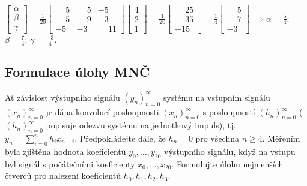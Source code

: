 $\begin{bmatrix}
    \alpha \\
    \beta \\
    \gamma
\end{bmatrix} = \frac{1}{20}
\begin{bmatrix}
    \phantom{-}5 &  \phantom{-}5 & -5\\
    \phantom{-}5 &  \phantom{-}9 & -3\\
    -5           & -3            &  \phantom{-}11
\end{bmatrix}
\begin{bmatrix}
    4 \\
    2 \\
    1
\end{bmatrix} = \frac{1}{20} 
\begin{bmatrix}
    \phantom{-}25\\
    \phantom{-}35\\
    -15
\end{bmatrix} = \frac{1}{4}
\begin{bmatrix}
    \phantom{-}5\\
    \phantom{-}7\\
    -3
\end{bmatrix}$ $\Rightarrow \alpha = \frac{5}{4}$; $\beta = \frac{7}{4}$; $\gamma = \frac{-3}{4}$.

\newpage
\subsection{Formulace úlohy MNČ}
Ať závislost výstupního signálu $(y_n)_{n=0}^\infty$ systému na vstupním signálu $(x_n)_{n=0}^\infty$ je dána konvolucí
posloupnosti $(x_n)_{n=0}^\infty$ s posloupností $(h_n)_{n=0}^\infty$ ($(h_n)_{n=0}^\infty$ popisuje odezvu systému
na jednotkový impuls), tj.  $y_n = \sum_{i=0}^{n}h_i x_{n-i}$. Předpokládejte dále, že $h_n = 0$ pro všechna $n \geq 4$.
Měřením byla zjištěna hodnota koeficientů $y_0, \dots, y_{20}$ výstupního signálu, když na vstupu byl signál s počátečními
koeficienty $x_0, \dots, x_{20}$. Formulujte úlohu nejmenších čtverců pro nalezení koeficientů $h_0, h_1, h_2, h_3$.

